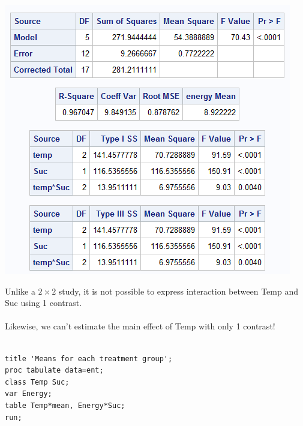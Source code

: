 \begin{center}
\includegraphics[scale=0.6]{Ent}
\end{center}

Unlike a $2\times2$ study, it is not possible to express interaction between Temp and Suc using 1 contrast.\\~\\
Likewise, we can't estimate the main effect of Temp with only 1 contrast!\\~\\

\newpage

\begin{small}
\begin{verbatim}
title 'Means for each treatment group';
proc tabulate data=ent;
class Temp Suc;
var Energy;
table Temp*mean, Energy*Suc;
run;
\end{verbatim}
\end{small}

